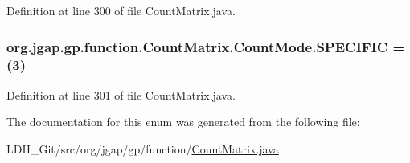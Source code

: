 Definition at line 300 of file Count\-Matrix.\-java.

\hypertarget{enumorg_1_1jgap_1_1gp_1_1function_1_1_count_matrix_1_1_count_mode_a0ba7a45ff144a42e337ecabdcb783a01}{
\subsubsection[{S\-P\-E\-C\-I\-F\-I\-C}]{\setlength{\rightskip}{0pt plus 5cm}org.\-jgap.\-gp.\-function.\-Count\-Matrix.\-Count\-Mode.\-S\-P\-E\-C\-I\-F\-I\-C =(3)}}\label{enumorg_1_1jgap_1_1gp_1_1function_1_1_count_matrix_1_1_count_mode_a0ba7a45ff144a42e337ecabdcb783a01}


Definition at line 301 of file Count\-Matrix.\-java.



The documentation for this enum was generated from the following file\-:\begin{DoxyCompactItemize}
\item 
L\-D\-H\-\_\-\-Git/src/org/jgap/gp/function/\hyperlink{_count_matrix_8java}{Count\-Matrix.\-java}\end{DoxyCompactItemize}
